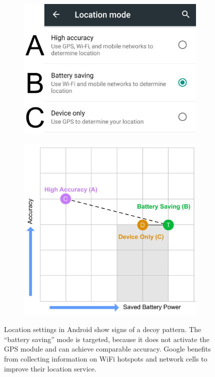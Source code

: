 \begin{figure}
	\begin{subfigure}[t]{0.49\textwidth}
		\includegraphics[width=\textwidth]{figures/decoy/Android_Location_Decoy}
	\end{subfigure}
	\begin{subfigure}[t]{0.49\textwidth}
		\includegraphics[width=\textwidth]{figures/decoy/decoy-dimensions-android}
	\end{subfigure}
	\caption{\label{fig:decoy:android-pattern}Location settings in Android show signs of a decoy pattern. The ``battery saving'' mode is targeted, because it does not activate the GPS module and can achieve comparable accuracy. Google benefits from collecting information on WiFi hotspots and network cells to improve their location service.} 
\end{figure}


